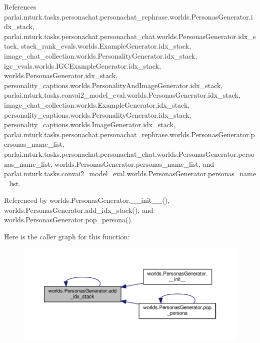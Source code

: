 References parlai.\+mturk.\+tasks.\+personachat.\+personachat\+\_\+rephrase.\+worlds.\+Personas\+Generator.\+idx\+\_\+stack, parlai.\+mturk.\+tasks.\+personachat.\+personachat\+\_\+chat.\+worlds.\+Personas\+Generator.\+idx\+\_\+stack, stack\+\_\+rank\+\_\+evals.\+worlds.\+Example\+Generator.\+idx\+\_\+stack, image\+\_\+chat\+\_\+collection.\+worlds.\+Personality\+Generator.\+idx\+\_\+stack, igc\+\_\+evals.\+worlds.\+I\+G\+C\+Example\+Generator.\+idx\+\_\+stack, worlds.\+Personas\+Generator.\+idx\+\_\+stack, personality\+\_\+captions.\+worlds.\+Personality\+And\+Image\+Generator.\+idx\+\_\+stack, parlai.\+mturk.\+tasks.\+convai2\+\_\+model\+\_\+eval.\+worlds.\+Personas\+Generator.\+idx\+\_\+stack, image\+\_\+chat\+\_\+collection.\+worlds.\+Example\+Generator.\+idx\+\_\+stack, personality\+\_\+captions.\+worlds.\+Personality\+Generator.\+idx\+\_\+stack, personality\+\_\+captions.\+worlds.\+Image\+Generator.\+idx\+\_\+stack, parlai.\+mturk.\+tasks.\+personachat.\+personachat\+\_\+rephrase.\+worlds.\+Personas\+Generator.\+personas\+\_\+name\+\_\+list, parlai.\+mturk.\+tasks.\+personachat.\+personachat\+\_\+chat.\+worlds.\+Personas\+Generator.\+personas\+\_\+name\+\_\+list, worlds.\+Personas\+Generator.\+personas\+\_\+name\+\_\+list, and parlai.\+mturk.\+tasks.\+convai2\+\_\+model\+\_\+eval.\+worlds.\+Personas\+Generator.\+personas\+\_\+name\+\_\+list.



Referenced by worlds.\+Personas\+Generator.\+\_\+\+\_\+init\+\_\+\+\_\+(), worlds.\+Personas\+Generator.\+add\+\_\+idx\+\_\+stack(), and worlds.\+Personas\+Generator.\+pop\+\_\+persona().

Here is the caller graph for this function\+:
\nopagebreak
\begin{figure}[H]
\begin{center}
\leavevmode
\includegraphics[width=350pt]{classworlds_1_1PersonasGenerator_a2eecaa6079fea0384e1e8538991196e9_icgraph}
\end{center}
\end{figure}
\mbox{\label{classworlds_1_1PersonasGenerator_a79c3dfc6c9967fb2733350352d78c0c0}} 
